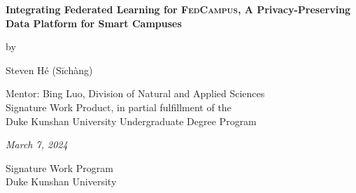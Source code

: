 \documentclass[11pt,a4paper,oneside]{report}
\newcommand{\fedcampus}{\textsc{FedCampus}\xspace}
\begin{document}
\newcommand{\authorname}{Steven Hé (Sīchàng)}

\newcommand{\thetitle}{Integrating Federated Learning for \fedcampus,
    A Privacy-Preserving Data Platform for Smart Campuses
}

\newcommand{\submissiondate}{March 7, 2024}

\newcommand{\mentor}{Bing Luo}

\newcommand{\academicunit}{Division of Natural and Applied Sciences}

\vspace*{\bigskipamount}

\begin{center}
    {\sffamily\LARGE\bfseries\MakeUppercase\thetitle\par}

    \bigskip

    by

    \bigskip

    {\Large \authorname}

    \bigskip

    Mentor: \mentor, \academicunit\\[12pt]
    Signature Work Product, in partial fulfillment of the \\
    Duke Kunshan University Undergraduate Degree Program

    \bigskip

    \emph{\submissiondate}

    \bigskip

    Signature Work Program \\
    Duke Kunshan University

\end{center}

\vfill
\end{document}
